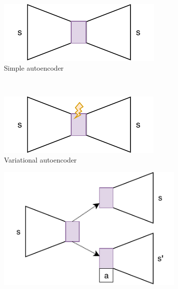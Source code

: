 \begin{figure}[ht!]
	\centering
	\begin{subfigure}{0.45\columnwidth}
		\centering
		\includegraphics[width=\linewidth]{img/very_simple_autoencoder.pdf}
		\caption{Simple autoencoder}
		\label{subfig:repr_learner_simple_autoencoder}
	\end{subfigure}%
	~ 
	\begin{subfigure}{0.45\columnwidth}
		\centering
		\includegraphics[width=\linewidth]{img/variational_autoencoder.pdf}
		\caption{Variational autoencoder}
		\label{subfig:repr_learner_vae}
	\end{subfigure}
	\begin{subfigure}{0.5\columnwidth}
		\centering
		\includegraphics[width=\linewidth]{img/janus.pdf}

\end{subfigure}
\end{figure}
